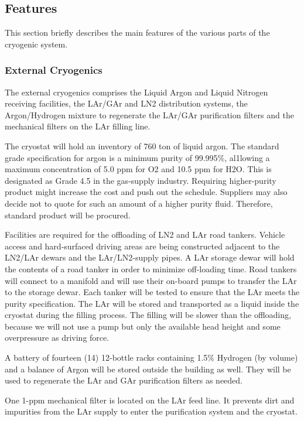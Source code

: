 \subsection{Features}

This section briefly describes the main features of the various parts of the cryogenic system.

\subsubsection{External Cryogenics}

The external cryogenics comprises the Liquid Argon and Liquid Nitrogen receiving facilities, the LAr/GAr and LN2 distribution systems, the Argon/Hydrogen mixture to regenerate the LAr/GAr purification filters and the mechanical filters on the LAr filling line.

The cryostat will hold an inventory of 760 ton of liquid argon. The standard grade specification for argon is a minimum purity of 99.995\%, al1lowing a maximum concentration of 5.0 ppm for O2 and 10.5 ppm for H2O. This is designated as Grade 4.5 in the gas-supply industry. Requiring higher-purity product might increase the cost and push out the schedule. Suppliers may also decide not to quote for such an amount of a higher purity fluid. Therefore, standard product will be procured.

Facilities are required for the offloading of LN2 and LAr road tankers. Vehicle access and hard-surfaced driving areas are being constructed adjacent to the LN2/LAr dewars and the LAr/LN2-supply pipes. A LAr storage dewar will hold the contents of a road tanker in order to minimize off-loading time. Road tankers will connect to a manifold and will use their on-board pumps to transfer the LAr to the storage dewar. Each tanker will be tested to ensure that the LAr meets the purity specification. The LAr will be stored and transported as a liquid inside the cryostat during the filling process. The filling will be slower than the offloading, because we will not use a pump but only the available head height and some overpressure as driving force. 

A battery of fourteen (14) 12-bottle racks containing 1.5\% Hydrogen (by volume) and a balance of Argon will be stored outside the building as well. They will be used to regenerate the LAr and GAr purification filters as needed.

One 1-ppm mechanical filter is located on the LAr feed line. It prevents dirt and impurities from the LAr supply to enter the purification system and the cryostat.

